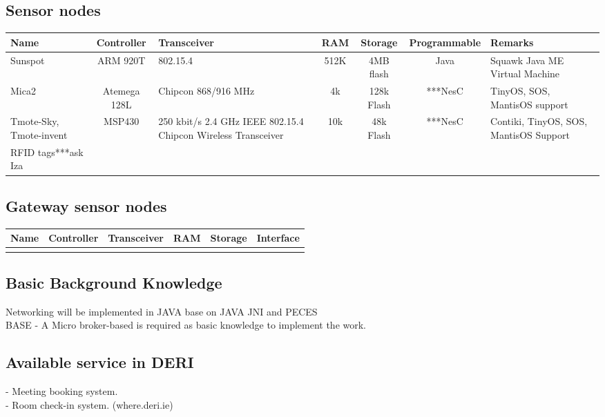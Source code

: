 \documentclass[a4paper]{llncs}
\newcommand{\head}[1]{\textnormal {\textbf{#1}}}
\begin{document}
\subsection{Sensor nodes}
\begin{tabular}{|p{2.5cm}|c|p{2cm}|c|c|c|p{2.5cm}|}
\hline
\head{Name} & \head{Controller} & \head{Transceiver} & \head{RAM} & \head{Storage} &\head{Programmable} &\head{Remarks}\\
\hline
{Sunspot} & {ARM 920T} & {802.15.4} & {512K} & {4MB flash} & {Java } & {Squawk Java ME Virtual Machine} \\
\hline
{Mica2} & {Atemega 128L} & {Chipcon 868/916 MHz}& {4k} & {128k Flash} & {***NesC} & {TinyOS, SOS, MantisOS support} \\
\hline
{Tmote-Sky, Tmote-invent} & {MSP430} & {250 kbit/s 2.4 GHz IEEE 802.15.4 Chipcon Wireless Transceiver} & {10k} & {48k Flash} & {***NesC} & {Contiki, TinyOS, SOS, MantisOS Support}\\
\hline
{RFID tags***ask Iza} &{}&{}&{}&{}&{}&{}\\
\hline
\end{tabular}

\subsection{Gateway sensor nodes}

\begin{tabular}{|p{2.5cm}|c|p{2cm}|c|c|c|}
\hline
\head{Name} & \head{Controller} & \head{Transceiver} & \head{RAM} & \head{Storage} &\head{Interface}\\
\hline
{} &{}&{}&{}&{}&{}\\
\hline
\end{tabular}

\subsection{Basic Background Knowledge}
Networking will be implemented in JAVA base on JAVA JNI and PECES\\
BASE - A Micro broker-based is required as basic knowledge to implement the work.

\subsection{Available service in DERI}
- Meeting booking system.\\
- Room check-in system. (where.deri.ie)
\end{document}
